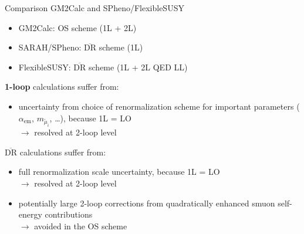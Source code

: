 \documentclass[hyperref={pdfpagelabels=false},ngerman]{beamer}
\renewcommand{\emph}{\textbf}
\newcommand{\DRbar}{\ensuremath{\overline{\text{DR}}}\xspace}
\begin{document}
\begin{frame}{Comparison GM2Calc and SPheno/FlexibleSUSY}
  \begin{itemize}
  \item GM2Calc: OS scheme (1L + 2L)
  \item SARAH/SPheno: \DRbar scheme (1L)
  \item FlexibleSUSY: \DRbar scheme (1L + 2L QED LL)
  \end{itemize}
  \vspace{1em}
  \emph{1-loop} calculations suffer from:
  \begin{itemize}
  \item uncertainty from choice of renormalization scheme for
    important parameters ($\alpha_{\text{em}}$, $m_{\tilde{\mu}_i}$,
    \ldots), because 1L = LO\\
    $\rightarrow$ resolved at 2-loop level
  \end{itemize}
  \vspace{1em}
  \emph{\DRbar} calculations suffer from:
  \begin{itemize}
  \item full renormalization scale uncertainty, because 1L = LO\\
    $\rightarrow$ resolved at 2-loop level
  \item potentially large 2-loop corrections from quadratically
    enhanced smuon self-energy contributions\\
    $\rightarrow$ avoided in the OS scheme
  \end{itemize}
\end{frame}
\end{document}
